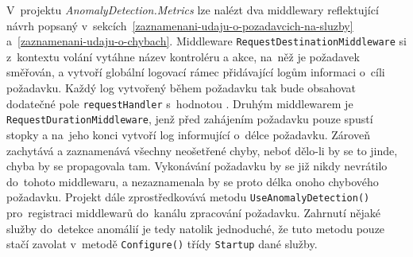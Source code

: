 V~projektu \emph{AnomalyDetection.Metrics} lze nalézt dva middlewary reflektující návrh popsaný v~sekcích~\ref{zaznamenani-udaju-o-pozadavcich-na-sluzby} a~\ref{zaznamenani-udaju-o-chybach}. Middleware \texttt{RequestDestinationMiddleware} si z~kontextu volání vytáhne název kontroléru a akce, na~něž je požadavek směřován, a vytvoří globální logovací rámec přidávající logům informaci o~cíli požadavku. Každý log vytvořený během požadavku tak bude obsahovat dodatečné pole \texttt{requestHandler} s~hodnotou . Druhým middlewarem je \texttt{RequestDurationMiddleware}, jenž před zahájením požadavku pouze spustí stopky a na~jeho konci vytvoří log informující o~délce požadavku. Zároveň zachytává a zaznamenává všechny neošetřené chyby, neboť dělo-li by se to jinde, chyba by se propagovala tam. Vykonávání požadavku by se již nikdy nevrátilo do~tohoto middlewaru, a nezaznamenala by se proto délka onoho chybového požadavku. Projekt dále zprostředkovává metodu \texttt{UseAnomalyDetection()} pro~registraci middlewarů do~kanálu zpracování požadavku. Zahrnutí nějaké služby do~detekce anomálií je tedy natolik jednoduché, že tuto metodu pouze stačí zavolat v~metodě \texttt{Configure()} třídy \texttt{Startup} dané služby.
